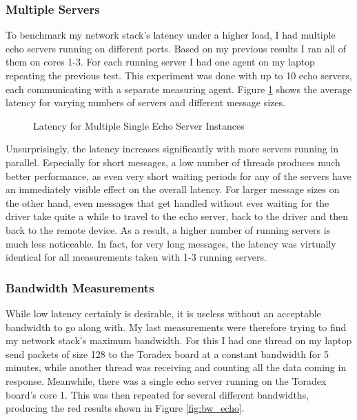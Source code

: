 \subsubsection{Multiple Servers}
To benchmark my network stack's latency under a higher load, I had multiple echo servers running on different ports. Based on my previous results I ran all of them on cores 1-3. For each running server I had one agent on my laptop repeating the previous test. This experiment was done with up to 10 echo servers, each communicating with a separate measuring agent. Figure \ref{fig:para_echo} shows the average latency for varying numbers of servers and different message sizes.

\begin{figure}[H]
\centering
    \resizebox{\textwidth}{!} {
        
    }
    \caption{Latency for Multiple Single Echo Server Instances}
    \label{fig:para_echo}
\end{figure}

Unsurprisingly, the latency increases significantly with more servers running in parallel. Especially for short messages, a low number of threads produces much better performance, as even very short waiting periods for any of the servers have an immediately visible effect on the overall latency. For larger message sizes on the other hand, even messages that get handled without ever waiting for the driver take quite a while to travel to the echo server, back to the driver and then back to the remote device. As a result, a higher number of running servers is much less noticeable. In fact, for very long messages, the latency was virtually identical for all measurements taken with 1-3 running servers.

\subsubsection{Bandwidth Measurements}
While low latency certainly is desirable, it is useless without an acceptable bandwidth to go along with. My last measurements were therefore trying to find my network stack's maximum bandwidth. For this I had one thread on my laptop send packets of size 128 to the Toradex board at a constant bandwidth for 5 minutes, while another thread was receiving and counting all the data coming in response. Meanwhile, there was a single echo server running on the Toradex board's core 1. This was then repeated for several different bandwidths, producing the red results shown in Figure \ref{fig:bw_echo}.

